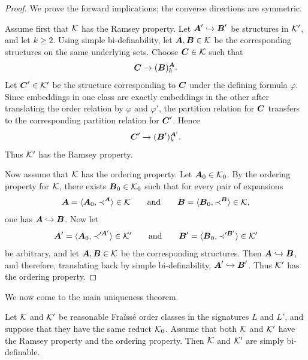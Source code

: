 \begin{proof}
    We prove the forward implications; the converse directions are symmetric.

    Assume first that \(\mathcal{K}\) has the Ramsey property. Let
    \(\boldsymbol{A}'\hookrightarrow \boldsymbol{B}'\)
    be structures in \(\mathcal{K}'\), and let \(k\geq 2\). Using simple bi-definability, let \(\boldsymbol{A},\boldsymbol{B}\in\mathcal{K}\) be the corresponding structures on the same underlying sets. Choose
    \(\boldsymbol{C}\in\mathcal{K}\)
    such that
    \[
        \boldsymbol{C}\to (\boldsymbol{B})^{\boldsymbol{A}}_k.
    \]
    Let \(\boldsymbol{C}'\in\mathcal{K}'\) be the structure corresponding to \(\boldsymbol{C}\) under the defining formula \(\varphi\). Since embeddings in one class are exactly embeddings in the other after translating the order relation by \(\varphi\) and \(\varphi'\), the partition relation for \(\boldsymbol{C}\) transfers to the corresponding partition relation for \(\boldsymbol{C}'\). Hence
    \[
        \boldsymbol{C}'\to (\boldsymbol{B}')^{\boldsymbol{A}'}_k.
    \]
    Thus \(\mathcal{K}'\) has the Ramsey property.

    Now assume that \(\mathcal{K}\) has the ordering property. Let \(\boldsymbol{A}_0\in\mathcal{K}_0\).
    By the ordering property for \(\mathcal{K}\), there exists \(\boldsymbol{B}_0\in\mathcal{K}_0\)
    such that for every pair of expansions
    \[
        \boldsymbol{A}=\langle \boldsymbol{A}_0,\prec^{\boldsymbol{A}}\rangle\in\mathcal{K}
        \qquad\text{and}\qquad
        \boldsymbol{B}=\langle \boldsymbol{B}_0,\prec^{\boldsymbol{B}}\rangle\in\mathcal{K},
    \]
    one has \(\boldsymbol{A}\hookrightarrow\boldsymbol{B}\). Now let
    \[
        \boldsymbol{A}'=\langle \boldsymbol{A}_0,\prec'^{\boldsymbol{A}'}\rangle\in\mathcal{K}'
        \qquad\text{and}\qquad
        \boldsymbol{B}'=\langle \boldsymbol{B}_0,\prec'^{\boldsymbol{B}'}\rangle\in\mathcal{K}'
    \]
    be arbitrary, and let \(\boldsymbol{A},\boldsymbol{B}\in\mathcal{K}\) be the corresponding structures. Then
    \(\boldsymbol{A}\hookrightarrow \boldsymbol{B}\),
    and therefore, translating back by simple bi-definability,
    \(\boldsymbol{A}'\hookrightarrow \boldsymbol{B}'\).
    Thus \(\mathcal{K}'\) has the ordering property.
\end{proof}

We now come to the main uniqueness theorem.

\begin{theorem}
    \label{thm:uniqueness-simple-bi-definability}
    Let \(\mathcal{K}\) and \(\mathcal{K}'\) be reasonable Fraïssé order classes in the
    signatures \(L\) and \(L'\), and suppose that they have the same reduct
    \(\mathcal{K}_0\).
    Assume that both \(\mathcal{K}\) and \(\mathcal{K}'\) have the Ramsey property and the ordering property. Then \(\mathcal{K}\) and \(\mathcal{K}'\) are simply bi-definable.
\end{theorem}

